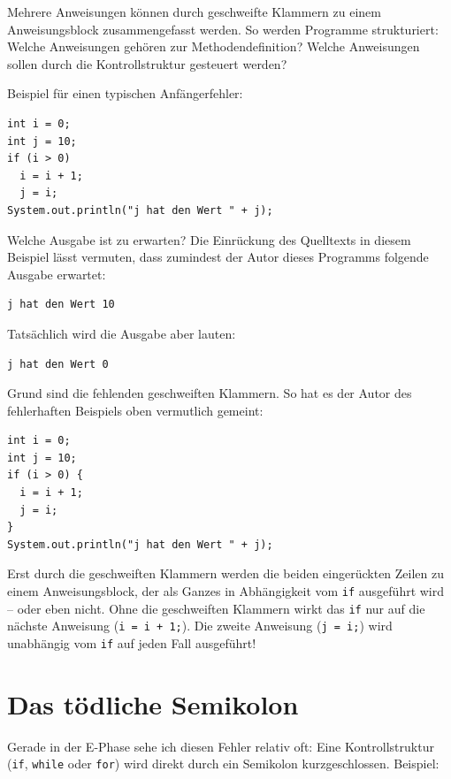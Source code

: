 Mehrere Anweisungen können durch geschweifte Klammern zu einem Anweisungsblock
zusammengefasst werden. So werden Programme strukturiert: Welche Anweisungen
gehören zur Methodendefinition? Welche Anweisungen sollen durch die
Kontrollstruktur gesteuert werden?

Beispiel für einen typischen Anfängerfehler:

\begin{lstlisting}
int i = 0;
int j = 10;
if (i > 0)
  i = i + 1;
  j = i;
System.out.println("j hat den Wert " + j);
\end{lstlisting}

Welche Ausgabe ist zu erwarten? Die Einrückung des Quelltexts in diesem Beispiel
lässt vermuten, dass zumindest der Autor dieses Programms folgende Ausgabe
erwartet:

\begin{lstlisting}
j hat den Wert 10
\end{lstlisting}

Tatsächlich wird die Ausgabe aber lauten:

\begin{lstlisting}
j hat den Wert 0
\end{lstlisting}

Grund sind die fehlenden geschweiften Klammern. So hat es der Autor des
fehlerhaften Beispiels oben vermutlich gemeint:

\begin{lstlisting}
int i = 0;
int j = 10;
if (i > 0) {
  i = i + 1;
  j = i;
}
System.out.println("j hat den Wert " + j);
\end{lstlisting}

Erst durch die geschweiften Klammern werden die beiden eingerückten Zeilen zu
einem Anweisungsblock, der als Ganzes in Abhängigkeit vom \lstinline|if|
ausgeführt wird -- oder eben nicht. Ohne die geschweiften Klammern wirkt das
\lstinline|if| nur auf die nächste Anweisung (\lstinline|i = i + 1;|). Die
zweite Anweisung (\lstinline|j = i;|) wird unabhängig vom \lstinline|if| auf jeden Fall
ausgeführt!


\section{Das tödliche Semikolon}

Gerade in der E-Phase sehe ich diesen Fehler relativ oft: Eine Kontrollstruktur
(\lstinline|if|, \lstinline|while| oder \lstinline|for|) wird direkt durch ein
Semikolon \glqq kurzgeschlossen\grqq . Beispiel:

